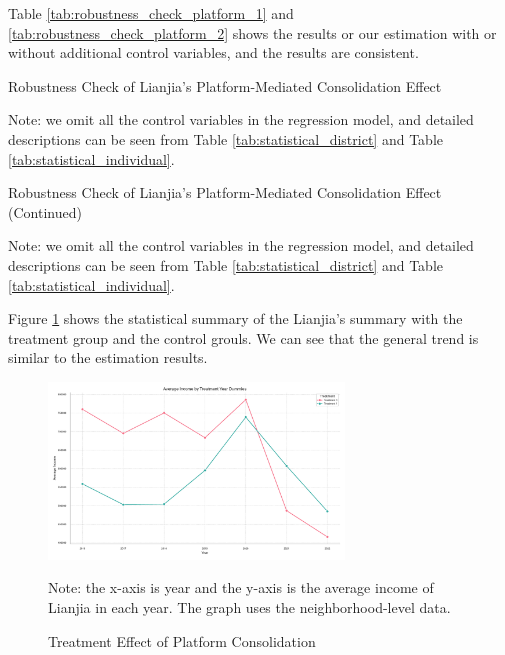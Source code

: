 \documentclass[11pt]{article}
\begin{document}
Table \ref{tab:robustness_check_platform_1} and \ref{tab:robustness_check_platform_2} shows the results or our estimation with or without additional control variables, and the results are consistent.

\begin{table}[H]
  \begin{center}
    \begin{scriptsize}
      \caption{Robustness Check of Lianjia's Platform-Mediated Consolidation Effect}
      \label{tab:robustness_check_platform_1}
      
    
    Note: we omit all the control variables in the regression model, and detailed descriptions can be seen from Table \ref{tab:statistical_district} and Table \ref{tab:statistical_individual}.
    \end{scriptsize}
  \end{center}
\end{table}

\begin{table}
  \begin{center}
    \begin{scriptsize}
      \caption{Robustness Check of Lianjia's Platform-Mediated Consolidation Effect (Continued)}
      \label{tab:robustness_check_platform_2}
      
    
    Note: we omit all the control variables in the regression model, and detailed descriptions can be seen from Table \ref{tab:statistical_district} and Table \ref{tab:statistical_individual}.
    \end{scriptsize}
  \end{center}
\end{table}

\clearpage

Figure \ref{fig:treatment_consolidation} shows the statistical summary of the Lianjia's summary with the treatment group and the control grouls. We can see that the general trend is similar to the estimation results.

\begin{figure}[H]
    \centering
    \includegraphics[width=0.7\textwidth]{../figures/average_income_by_treatment_platform.pdf}
    \caption{Treatment Effect of Platform Consolidation}
    \label{fig:treatment_consolidation}
    Note: the x-axis is year and the y-axis is the average income of Lianjia in each year. The graph uses the neighborhood-level data.
\end{figure}
\end{document}
